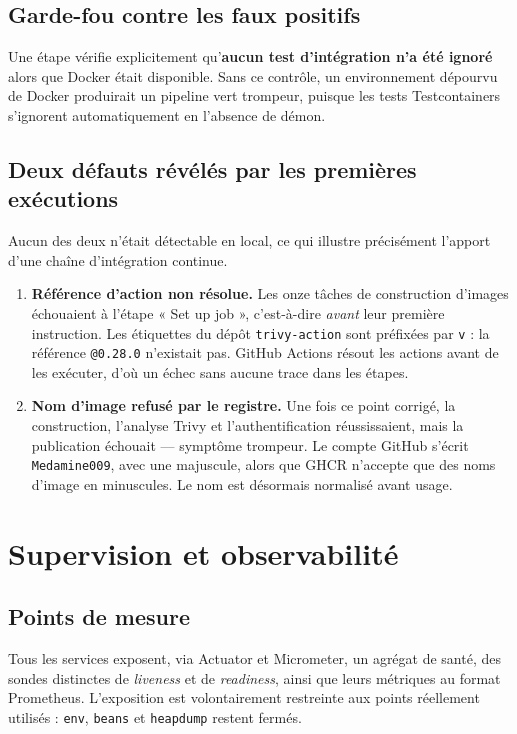 \subsection{Garde-fou contre les faux positifs}
Une étape vérifie explicitement qu'\textbf{aucun test d'intégration n'a été ignoré} alors
que Docker était disponible. Sans ce contrôle, un environnement dépourvu de Docker
produirait un pipeline vert trompeur, puisque les tests Testcontainers s'ignorent
automatiquement en l'absence de démon.

\subsection{Deux défauts révélés par les premières exécutions}
Aucun des deux n'était détectable en local, ce qui illustre précisément l'apport d'une
chaîne d'intégration continue.

\begin{enumerate}
  \item \textbf{Référence d'action non résolue.} Les onze tâches de construction d'images
        échouaient à l'étape « Set up job », c'est-à-dire \emph{avant} leur première
        instruction. Les étiquettes du dépôt \texttt{trivy-action} sont préfixées par
        \texttt{v} : la référence \texttt{@0.28.0} n'existait pas. GitHub Actions résout les
        actions avant de les exécuter, d'où un échec sans aucune trace dans les étapes.
  \item \textbf{Nom d'image refusé par le registre.} Une fois ce point corrigé, la
        construction, l'analyse Trivy et l'authentification réussissaient, mais la
        publication échouait — symptôme trompeur. Le compte GitHub s'écrit
        \texttt{Medamine009}, avec une majuscule, alors que GHCR n'accepte que des noms
        d'image en minuscules. Le nom est désormais normalisé avant usage.
\end{enumerate}

\section{Supervision et observabilité}

\subsection{Points de mesure}
Tous les services exposent, via Actuator et Micrometer, un agrégat de santé, des sondes
distinctes de \emph{liveness} et de \emph{readiness}, ainsi que leurs métriques au format
Prometheus. L'exposition est volontairement restreinte aux points réellement utilisés :
\texttt{env}, \texttt{beans} et \texttt{heapdump} restent fermés.

